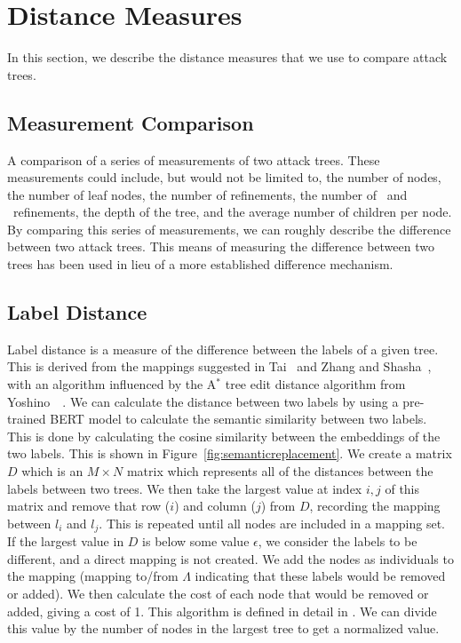 \section{Distance Measures}

In this section, we describe the distance measures that we use to compare attack trees. 

\subsection{Measurement Comparison}

A comparison of a series of measurements of two attack trees. These measurements could include, but would not be limited to, the number of nodes, the number of leaf nodes, the number of refinements, the number of \AND\ and \OR\ refinements, the depth of the tree, and the average number of children per node. By comparing this series of measurements, we can roughly describe the difference between two attack trees. This means of measuring the difference between two trees has been used in lieu of a more established difference mechanism. 

\subsection{Label Distance}
\label{ssec:label-distance}

Label distance is a measure of the difference between the labels of a given tree. This is derived from the mappings suggested in Tai~\cite{tai_tree--tree_1979} and Zhang and Shasha~\cite{Zhang_Shasha_1989}, with an algorithm influenced by the A$^*$ tree edit distance algorithm from Yoshino~\etal~\cite{yoshino_dynamic_2013}. We can calculate the distance between two labels by using a pre-trained BERT model to calculate the semantic similarity between two labels. This is done by calculating the cosine similarity between the embeddings of the two labels. This is shown in Figure~\ref{fig:semanticreplacement}. We create a matrix $D$ which is an $M \times N$ matrix which represents all of the distances between the labels between two trees. We then take the largest value at index $i, j$ of this matrix and remove that row ($i$) and column ($j$) from $D$, recording the mapping between $l_i$ and $l_j$. This is repeated until all nodes are included in a mapping set. If the largest value in $D$ is below some value $\epsilon$, we consider the labels to be different, and a direct mapping is not created. We add the nodes as individuals to the mapping (mapping to/from $\Lambda$ indicating that these labels would be removed or added). We then calculate the cost of each node that would be removed or added, giving a cost of 1. This algorithm is defined in detail in . We can divide this value by the number of nodes in the largest tree to get a normalized value. 

